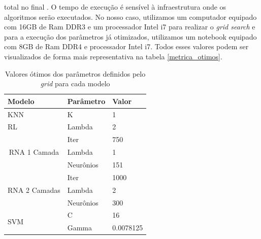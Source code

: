 \documentclass[10pt, conference, compsocconf]{IEEEtran}
\begin{document}
total no final \cite{octave:tictoc}. O tempo de execução é sensível à infraestrutura onde os algoritmos serão executados. No nosso caso, utilizamos um computador equipado com 16GB de Ram DDR3 e um processador Intel i7 para realizar o \textit{grid search} e para a execução dos parâmetros já otimizados, utilizamos um notebook equipado com 8GB de Ram DDR4 e processador Intel i7.
Todos esses valores podem ser visualizados de forma mais 
representativa na tabela \ref{metrica_otimos}.

\begin{table}[]
\centering
\caption{Valores ótimos dos parâmetros definidos pelo \textit{grid} para cada modelo}
\label{parametros}
\begin{tabular}{|l|l|l|}
\hline
Modelo                                              & \multicolumn{1}{|l|}{Parâmetro} & Valor     \\ \hline
KNN                                                 & K                              & 1         \\ \hline
RL                                                  & Lambda                         & 2         \\ \hline
\multicolumn{1}{|c|}{\multirow{3}{*}{RNA 1 Camada}} & Iter                           & 750       \\
\multicolumn{1}{|c|}{}                              & Lambda                         & 1         \\
\multicolumn{1}{|c|}{}                              & Neurônios                      & 151       \\ \hline
\multirow{3}{*}{RNA 2 Camadas}                      & Iter                           & 1000      \\
                                                    & Lambda                         & 2         \\
                                                    & Neurônios                      & 300       \\ \hline
\multirow{2}{*}{SVM}                                & C
& 16        \\
                                                    & Gamma                          & 0.0078125 \\ \hline
\end{tabular}
\end{table}
\end{document}

